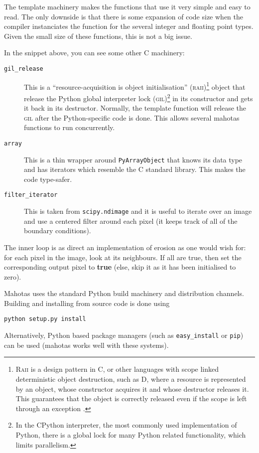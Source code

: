 \documentclass{article}
\newcommand*{\cpp}{{C\nolinebreak[4]\hspace{-.05em}\raisebox{.4ex}{\tiny\textbf{++}}}}
\let\code\texttt
\begin{document}
The template machinery makes the functions that use it very simple and easy to
read. The only downside is that there is some expansion of code size when the
compiler instanciates the function for the several integer and floating point
types. Given the small size of these functions, this is not a big issue.

In the snippet above, you can see some other \cpp{} machinery:

\begin{description}
\item[\code{gil\_release}] This is a ``resource-acquisition is object
initialisation'' (\textsc{raii})\footnote{\textsc{Raii} is a design pattern in
\cpp{}, or other languages with scope linked deterministic object destruction,
such as D, where a resource is represented by an object, whose constructor
acquires it and whose destructor releases it. This guarantees that the object
is correctly released even if the scope is left through an exception
\citep{Stroustrup1994}.} object that release the Python global interpreter lock
(\textsc{gil})\footnote{In the CPython interpreter, the most commonly used
implementation of Python, there is a global lock for many Python related
functionality, which limits parallelism.} in its constructor and gets it back
in its destructor. Normally, the template function will release the
\textsc{gil} after the Python-specific code is done. This allows several
mahotas functions to run concurrently.
\item[\code{array}] This is a thin wrapper around \code{PyArrayObject} that
knows its data type and has iterators which resemble the \cpp{} standard
library. This makes the code type-safer.
\item[\code{filter\_iterator}] This is taken from \code{scipy.ndimage} and it
is useful to iterate over an image and use a centered filter around each pixel
(it keeps track of all of the boundary conditions).
\end{description}

The inner loop is as direct an implementation of erosion as one would wish for:
for each pixel in the image, look at its neighbours. If all are true, then set
the corresponding output pixel to \textbf{true} (else, skip it as it has been
initialised to zero).

Mahotas uses the standard Python build machinery and distribution channels.
Building and installing from source code is done using
\begin{verbatim}
python setup.py install
\end{verbatim}
Alternatively, Python based package managers (such as \texttt{easy\_install} or
\texttt{pip}) can be used (mahotas works well with these systems).
\end{document}
